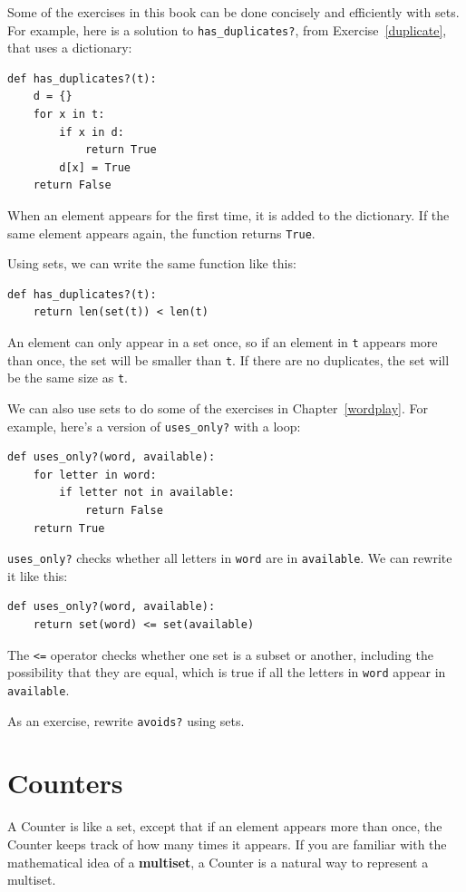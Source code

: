 \documentclass[10pt]{book}
\begin{document}
Some of the exercises in this book can be done concisely and
efficiently with sets.  For example, here is a solution to
\verb"has_duplicates?", from
Exercise~\ref{duplicate}, that uses a dictionary:

\begin{verbatim}
def has_duplicates?(t):
    d = {}
    for x in t:
        if x in d:
            return True
        d[x] = True
    return False
\end{verbatim}

When an element appears for the first time, it is added to the
dictionary.  If the same element appears again, the function returns
{\tt True}.

Using sets, we can write the same function like this:

\begin{verbatim}
def has_duplicates?(t):
    return len(set(t)) < len(t)
\end{verbatim}
%
An element can only appear in a set once, so if an element in {\tt t}
appears more than once, the set will be smaller than {\tt t}.  If there
are no duplicates, the set will be the same size as {\tt t}.

We can also use sets to do some of the exercises in
Chapter~\ref{wordplay}.  For example, here's a version of
\verb"uses_only?" with a loop:

\begin{verbatim}
def uses_only?(word, available):
    for letter in word: 
        if letter not in available:
            return False
    return True
\end{verbatim}
%
\verb"uses_only?" checks whether all letters in {\tt word} are
in {\tt available}.  We can rewrite it like this:

\begin{verbatim}
def uses_only?(word, available):
    return set(word) <= set(available)
\end{verbatim}
%
The \verb"<=" operator checks whether one set is a subset or another,
including the possibility that they are equal, which is true if all
the letters in {\tt word} appear in {\tt available}.

As an exercise, rewrite \verb"avoids?" using sets.


\section{Counters}

A Counter is like a set, except that if an element appears more
than once, the Counter keeps track of how many times it appears.
If you are familiar with the mathematical idea of a {\bf multiset},
a Counter is a natural way to represent a multiset.
\end{document}
